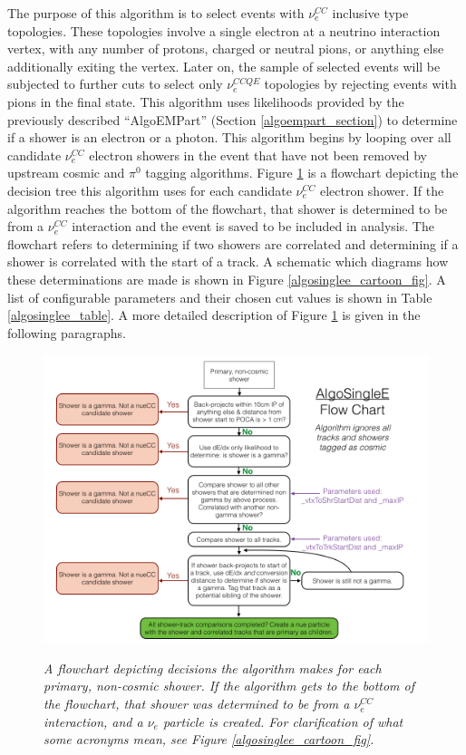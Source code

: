 The purpose of this algorithm is to select events with $\nu_e^{CC}$ inclusive type topologies. These topologies involve a single electron at a neutrino interaction vertex, with any number of protons, charged or neutral pions, or anything else additionally exiting the vertex. Later on, the sample of selected events will be subjected to further cuts to select only $\nu_e^{CCQE}$ topologies by rejecting events with pions in the final state. This algorithm uses likelihoods provided by the previously described ``AlgoEMPart'' (Section \ref{algoempart_section}) to determine if a shower is an electron or a photon. This algorithm begins by looping over all candidate $\nu_e^{CC}$ electron showers in the event that have not been removed by upstream cosmic and $\pi^0$ tagging algorithms. Figure \ref{algosinglee_flowchart_fig} is a flowchart depicting the decision tree this algorithm uses for each candidate $\nu_e^{CC}$ electron shower. If the algorithm reaches the bottom of the flowchart, that shower is determined to be from a $\nu_e^{CC}$ interaction and the event is saved to be included in analysis. The flowchart refers to determining if two showers are correlated and determining if a shower is correlated with the start of a track. A schematic which diagrams how these determinations are made is shown in Figure \ref{algosinglee_cartoon_fig}. A list of configurable parameters and their chosen cut values is shown in Table \ref{algosinglee_table}. A more detailed description of Figure \ref{algosinglee_flowchart_fig} is given in the following paragraphs.\\


\begin{figure}[ht!]
\centering
\includegraphics[width=150mm]{Figures/algosinglee_flowchart.png}\\
\caption{\textit{A flowchart depicting decisions the algorithm makes for each primary, non-cosmic shower. If the algorithm gets to the bottom of the flowchart, that shower was determined to be from a $\nu_e^{CC}$ interaction, and a $\nu_e$ particle is created. For clarification of what some acronyms mean, see Figure \ref{algosinglee_cartoon_fig}.}}
\label{algosinglee_flowchart_fig}
\end{figure}


